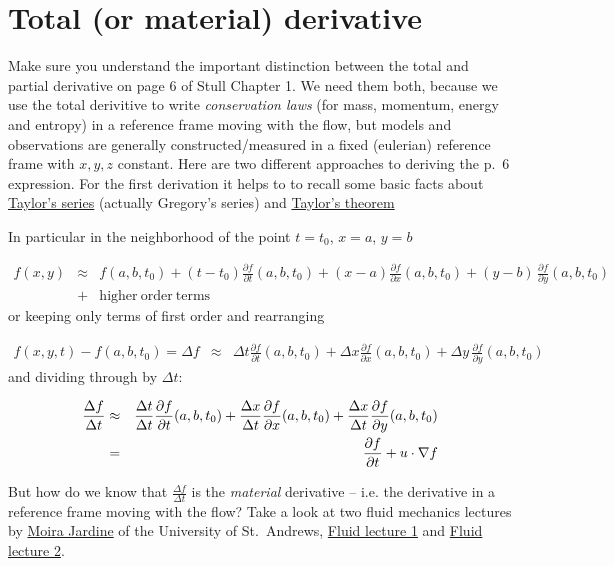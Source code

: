 \documentclass[12pt]{article}
\begin{document}
\pagestyle{first}


\section{Total (or material) derivative}
\label{sec:total-derivitive}

Make sure you understand
the important distinction between the total and partial derivative
on page 6 of Stull Chapter 1.   We need them both, because we use the
total derivitive to write \textit{conservation laws} (for mass, momentum,
energy and entropy) in a reference frame moving with the flow, but
models and observations are generally constructed/measured in a fixed 
(eulerian) reference frame with $x,y,z$ constant. Here are two different approaches
to deriving the p.~6 expression.  
For the first derivation it helps to  to recall some basic facts about
\href{http://en.wikipedia.org/wiki/Taylor_series}{Taylor's series}
(actually Gregory's series) and
\href{http://bit.ly/TaylorsTheorem}{Taylor's theorem}

In particular in the neighborhood of the point $t=t_0$, $x=a$, $y=b$

\begin{eqnarray*}
f(x,y)
&\approx& f(a,b,t_0) + (t-t_0)\frac{\partial f }{\partial t}(a,b,t_0) +(x-a)\frac{\partial f }{\partial x}(a,b,t_0) +(y-b)\, \frac{\partial f }{\partial y}(a,b,t_0) \\
&+& \mathrm{higher\ order\ terms}
\end{eqnarray*}
or keeping only terms of first order and rearranging

\begin{eqnarray*}
f(x,y,t) - f(a,b,t_0) = \Delta f
&\approx& \Delta t \frac{\partial f }{\partial t}(a,b,t_0) +  \Delta x \frac{\partial f }{\partial x}(a,b,t_0) + \Delta y\, \frac{\partial f }{\partial y}(a,b,t_0)
\end{eqnarray*}
and dividing through by $\Delta t$:

\begin{eqnarray*}
\frac{\Delta f }{\Delta t} 
&\approx& \frac{\Delta t }{\Delta t} \frac{\partial f }{\partial t}(a,b,t_0) +  \frac{\Delta x }{\Delta t} \frac{\partial f }{\partial x}(a,b,t_0) + \frac{\Delta x }{\Delta t} \frac{\partial f }{\partial y}(a,b,t_0) \\
&=& \frac{\partial f }{\partial t} +  \boldmath{u} \cdot \nabla f
\end{eqnarray*}

But how do we know that $\frac{\Delta f }{\Delta t}$ is the \textit{material} derivative -- i.e. the
derivative in a reference frame moving with the flow?  Take a look 
at two fluid mechanics lectures by
\href{http://star-www.st-and.ac.uk/~mmj}{Moira Jardine} of the University
of St.~Andrews, \href{https://www.dropbox.com/s/e2q2eruf7d0kk4w/fluids_01.pdf?dl=0}{Fluid lecture 1} and
\href{https://www.dropbox.com/s/7d89qa4v2kus0r6/fluids_02.pdf?dl=0}{Fluid lecture 2}.
\end{document}

